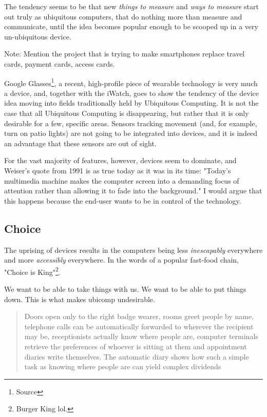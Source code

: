 The tendency seems to be that new \emph{things to measure} and \emph{ways to measure} start out truly as ubiquitous computers, that do
nothing more than measure and communicate, until the idea becomes popular enough to be scooped up in a very un-ubiquitous device.

Note: Mention the project that is trying to make smartphones replace travel cards, payment cards, access cards.

Google Glasses\footnote{Source}, a recent, high-profile piece of wearable technology is very much a device, and, together with the iWatch,
goes to show the tendency of the device idea moving into fields traditionally held by Ubiquitous Computing. It is not the case that all
Ubiquitous Computing is disappearing, but rather that it is only desirable for a few, specific areas. Sensors tracking movement (and, for
example, turn on patio lights) are not going to be integrated into devices, and it is indeed an advantage that these sensors are out of sight.

For the vast majority of features, however, devices seem to dominate, and Weiser's quote from 1991 is as true today as it was in its
time: "Today's multimedia machine makes the computer screen into a demanding focus of attention rather than allowing it to fade into the
background."\cite{weiser91} I would argue that this happens because the end-user wants to be in control of the technology.

\subsection{Choice}

The uprising of devices results in the computers being less \emph{inescapably} everywhere and more \emph{accessibly} everywhere. In the words
of a popular fast-food chain, "Choice is King"\footnote{Burger King lol.}.

We want to be able to take things with us. We want to be able to put things down. This is what makes ubicomp undesirable.

\begin{quote}
    Doors open only to the right badge wearer, rooms greet people by name, telephone calls can be automatically forwarded to wherever the recipient may be, receptionists actually know where people are, computer terminals retrieve the preferences of whoever is sitting at them and appointment diaries write themselves. The automatic diary shows how such a simple task as knowing where people are can yield complex dividends\cite{weiser91}
\end{quote}

